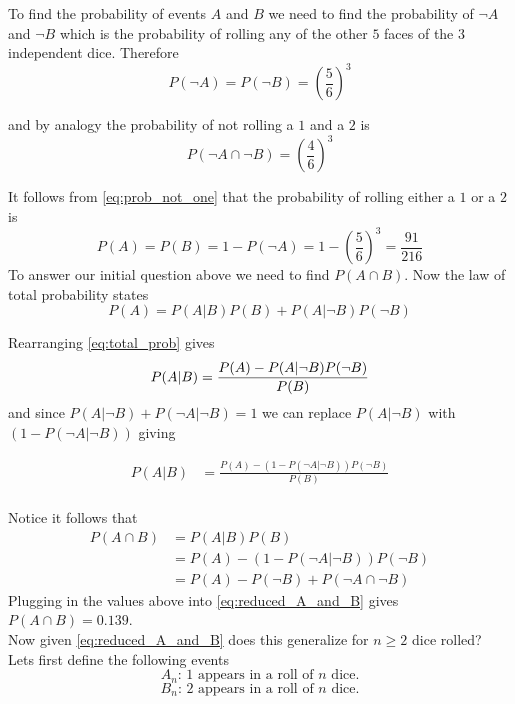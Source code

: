 \documentclass[12pt,a4paper]{article}
\begin{document}
To find the probability of events $A$ and $B$ we need to find the probability of $\neg A$ and $\neg B$ which is the probability of rolling any of the other $5$ faces of the $3$ independent dice. Therefore
\begin{equation}
P(\neg A) = P(\neg B) = \left(\frac{5}{6}\right)^3
\label{eq:prob_not_one}
\end{equation}

and by analogy the probability of not rolling a $1$ and a $2$ is
\begin{equation}
P(\neg A \cap \neg B) = \left(\frac{4}{6}\right)^3
\label{eq:prob_one_and_two}
\end{equation}

It follows from \cref{eq:prob_not_one} that the probability of rolling either a $1$ or a $2$ is
\begin{equation}
P(A) = P(B) = 1-P(\neg A) = 1 - \left(\frac{5}{6}\right)^3 = \frac{91}{216}
\end{equation}
To answer our initial question above we need to find $P(A \cap B)$. Now the law of total probability states
\begin{equation}
P(A) = P(A|B)P(B)+P(A|\neg B)P(\neg B)
\label{eq:total_prob}
\end{equation}

Rearranging \cref{eq:total_prob} gives
\begin{equation}
P(A|B)  = \frac{P(A) - P(A|\neg B)P(\neg B)}{P(B)}\\
\end{equation}
and since $P(A|\neg B) + P(\neg A|\neg B) = 1$ we can replace $P(A|\neg B)$ with $(1 - P(\neg A|\neg B))$ giving 

\begin{align}
P(A|B)  &= \frac{P(A) - (1 - P(\neg A|\neg B))P(\neg B)}{P(B)}\\
\label{eq:A_cond_B}
\end{align}

Notice it follows that
\begin{align}
P(A \cap B)     &= P(A|B)P(B)\\
                &= P(A) - (1 - P(\neg A|\neg B)) P(\neg B)\\
                &= P(A) - P(\neg B) + P(\neg A \cap \neg B)
\label{eq:reduced_A_and_B}
\end{align}
Plugging in the values above into \cref{eq:reduced_A_and_B} gives $P(A \cap B) = 0.139$.\\

Now given \cref{eq:reduced_A_and_B} does this generalize for $n\geq 2$ dice rolled? Lets first define the following events
\begin{equation}
A_n \text{: 1 appears in a roll of $n$ dice.}
\end{equation}
\begin{equation}
B_n \text{: 2 appears in a roll of $n$ dice.}
\end{equation}
\end{document}

